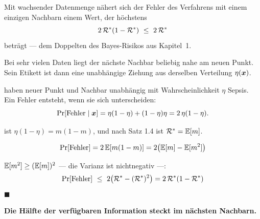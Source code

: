 \begin{merksatz}
Mit wachsender Datenmenge nähert sich der Fehler des Verfahrens mit einem einzigen Nachbarn einem Wert, der höchstens
\[ 2\,\Risk^{*}(1-\Risk^{*}) \ \le\ 2\,\Risk^{*} \]
beträgt --- dem Doppelten des Bayes-Risikos aus Kapitel~1.

Bei sehr vielen Daten liegt der nächste Nachbar beliebig nahe am neuen Punkt. Sein Etikett ist dann eine unabhängige Ziehung aus derselben Verteilung $\eta(\boldsymbol{x})$.

\begin{center}
\begin{minipage}{0.86\textwidth}
\end{minipage}
\end{center}

 haben neuer Punkt und Nachbar unabhängig mit Wahrscheinlichkeit $\eta$ Sepsis. Ein Fehler entsteht, wenn sie sich unterscheiden:
\[ \Pr[\text{Fehler} \mid \boldsymbol{x}] = \eta(1-\eta) + (1-\eta)\eta = 2\,\eta(1-\eta) . \]

 ist $\eta(1-\eta) = m(1-m)$, und nach Satz 1.4 ist $\mathcal{R}^{*} = \mathbb{E}[m]$.

\[ \Pr[\text{Fehler}] = 2\,\mathbb{E}[m(1-m)] = 2\bigl(\mathbb{E}[m] - \mathbb{E}[m^{2}]\bigr) \]

 $\mathbb{E}[m^{2}] \ge (\mathbb{E}[m])^{2}$ --- die Varianz ist nichtnegativ ---:
\[ \Pr[\text{Fehler}] \ \le\ 2\bigl(\mathcal{R}^{*} - (\mathcal{R}^{*})^{2}\bigr) = 2\,\mathcal{R}^{*}(1-\mathcal{R}^{*}) \]
$\blacksquare$

\begin{center}
\begin{minipage}{0.9\textwidth}
\textbf{Die Hälfte der verfügbaren Information steckt im nächsten Nachbarn.}
\end{minipage}
\end{center}

\begin{center}
\begin{minipage}{0.88\textwidth}
\end{minipage}
\end{center}
\end{merksatz}

